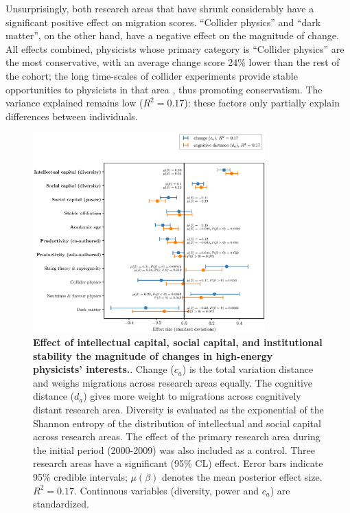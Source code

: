 \documentclass{article}
\begin{document}
Unsurprisingly, both research areas that have shrunk considerably have a significant positive effect on migration scores. ``Collider physics'' and ``dark matter'', on the other hand, have a negative effect on the magnitude of change. All effects combined, physicists whose primary category is ``Collider physics'' are the most conservative, with an average change score 24\% lower than the rest of the cohort; the long time-scales of collider experiments provide stable opportunities to physicists in that area \citep[p.~138]{galison1987how}, thus promoting conservatism. The variance explained remains low ($R^2=0.17$): these factors only partially explain differences between individuals.

\begin{figure}[h]
    \centering
    \includegraphics[width=0.8\textwidth]{Fig7}
    \caption{\textbf{Effect of intellectual capital, social capital, and institutional stability the magnitude of changes in high-energy physicists' interests.}. Change ($c_a$) is the total variation distance and weighs migrations across research areas equally. The cognitive distance ($d_a$) gives more weight to migrations across cognitively distant research area. Diversity is evaluated as the exponential of the Shannon entropy of the distribution of intellectual and social capital across research areas. The effect of the primary research area during the initial period (2000-2009) was also included as a control. Three research areas have a significant (95\% CL) effect. Error bars indicate 95\% credible intervals; $\mu(\beta)$ denotes the mean posterior effect size. $R^2=0.17$. Continuous variables (diversity, power and $c_a$) are standardized.}
    \label{fig:change_score_effect}
\end{figure}
\end{document}
